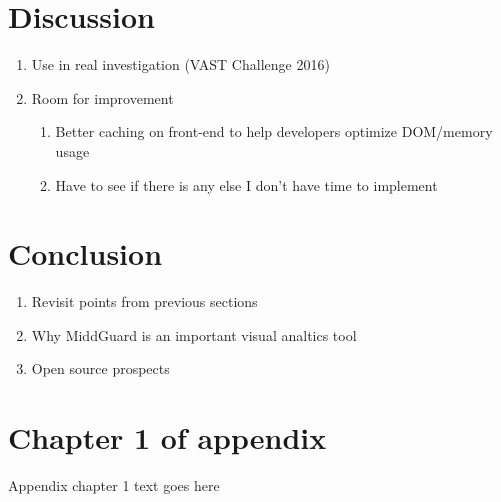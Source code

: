 \documentclass[midd]{thesis}
\begin{document}
\chapter{Discussion}
  \begin{enumerate}
    \item Use in real investigation (VAST Challenge 2016)
    \item Room for improvement
    \begin{enumerate}
      \item Better caching on front-end to help developers optimize DOM/memory
      usage
      \item Have to see if there is any else I don't have time to implement
    \end{enumerate}
  \end{enumerate}

\chapter{Conclusion}
  \begin{enumerate}
    \item Revisit points from previous sections
    \item Why MiddGuard is an important visual analtics tool
    \item Open source prospects
  \end{enumerate}

\appendix
\chapter{Chapter 1 of appendix}
Appendix chapter 1 text goes here


\end{document}
